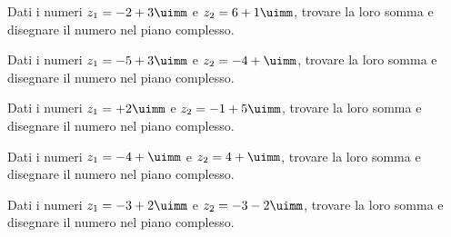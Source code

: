  \begin{exercise}[no solution]
	Dati i numeri $z_1=-2+3\uimm$ e $z_2=6+1\uimm$, trovare la loro somma e  disegnare il numero nel piano complesso.
\end{exercise}
 \begin{exercise}[no solution]
	Dati i numeri $z_1=-5+3\uimm$ e $z_2=-4+\uimm$, trovare la loro somma e  disegnare il numero nel piano complesso.
\end{exercise}
 \begin{exercise}[no solution]
	Dati i numeri $z_1=+2\uimm$ e $z_2=-1+5\uimm$, trovare la loro somma e  disegnare il numero nel piano complesso.
\end{exercise}
 \begin{exercise}[no solution]
	Dati i numeri $z_1=-4+\uimm$ e $z_2=4+\uimm$, trovare la loro somma e  disegnare il numero nel piano complesso.
\end{exercise}
 \begin{exercise}[no solution]
	Dati i numeri $z_1=-3+2\uimm$ e $z_2=-3-2\uimm$, trovare la loro somma e  disegnare il numero nel piano complesso.
\end{exercise}
